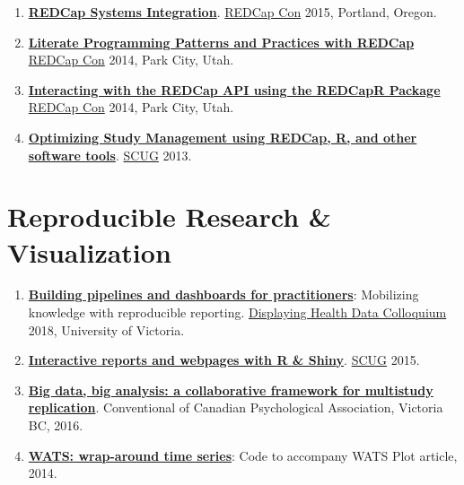 \documentclass[]{book}
\providecommand{\tightlist}{%
  \setlength{\itemsep}{0pt}\setlength{\parskip}{0pt}}
\begin{document}
\begin{enumerate}
\def\labelenumi{\arabic{enumi}.}
\tightlist
\item
  \textbf{\href{https://github.com/OuhscBbmc/BbmcResources/blob/master/Publications/Presentation2015-09-REDCapCon/REDCapIntegration.pdf}{REDCap Systems Integration}}. \href{https://projectredcap.org/about/redcapcon/}{REDCap Con} 2015, Portland, Oregon.
\item
  \textbf{\href{https://github.com/OuhscBbmc/RedcapExamplesAndPatterns/blob/master/Publications/Presentation-2014-09-REDCapCon/LiterateProgrammingPatternsAndPracticesWithREDCap.pptx}{Literate Programming Patterns and Practices with REDCap}} \href{https://projectredcap.org/about/redcapcon/}{REDCap Con} 2014, Park City, Utah.
\item
  \textbf{\href{https://github.com/OuhscBbmc/RedcapExamplesAndPatterns/blob/master/Publications/Presentation-2014-09-REDCapCon/REDCapR.pptx}{Interacting with the REDCap API using the REDCapR Package}} \href{https://projectredcap.org/about/redcapcon/}{REDCap Con} 2014, Park City, Utah.
\item
  \textbf{\href{https://github.com/OuhscBbmc/StatisticalComputing/blob/master/2013_Presentations/03_March/RedcapForUserGroup.pptx}{Optimizing Study Management using REDCap, R, and other software tools}}. \href{https://github.com/OuhscBbmc/StatisticalComputing}{SCUG} 2013.
\end{enumerate}

\hypertarget{reproducible-research-visualization}{%
\section{Reproducible Research \& Visualization}\label{reproducible-research-visualization}}

\begin{enumerate}
\def\labelenumi{\arabic{enumi}.}
\tightlist
\item
  \textbf{\href{https://github.com/dss-ialh/displaying-health-data/blob/master/documentation/products/beasley/dhd-2018-uvic-3-a-beasley-2018-11-29.pdf}{Building pipelines and dashboards for practitioners}}: Mobilizing knowledge with reproducible reporting. \href{https://github.com/dss-ialh/displaying-health-data}{Displaying Health Data Colloquium} 2018, University of Victoria.
\item
  \textbf{\href{https://rawgit.com/OuhscBbmc/StatisticalComputing/master/2015_Presentations/10_October/beasley-scug-shiny-2015-10.html\#/}{Interactive reports and webpages with R \& Shiny}}. \href{https://github.com/OuhscBbmc/StatisticalComputing}{SCUG} 2015.
\item
  \textbf{\href{https://github.com/IALSA/IALSA-2015-Portland/blob/master/pubs/2016-talks/2016-06-09-cpa/ppt/koval-etal-2016-06-10-cpa.pdf}{Big data, big analysis: a collaborative framework for multistudy replication}}. Conventional of Canadian Psychological Association, Victoria BC, 2016.
\item
  \textbf{\href{https://github.com/OuhscBbmc/Wats}{WATS: wrap-around time series}}: Code to accompany WATS Plot article, 2014.
\end{enumerate}
\end{document}
